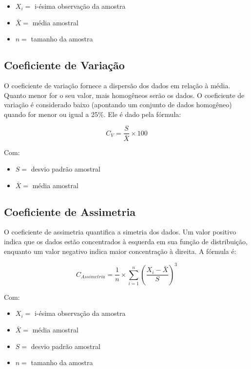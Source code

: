 \documentclass[
]{estat/estat}
\begin{document}
\begin{itemize}
\item
  \(X_i =\) i-ésima observação da amostra
\item
  \(\bar{X} =\) média amostral
\item
  \(n =\) tamanho da amostra
\end{itemize}

\hypertarget{coeficiente-de-variauxe7uxe3o}{%
\subsection{Coeficiente de
Variação}\label{coeficiente-de-variauxe7uxe3o}}

O coeficiente de variação fornece a dispersão dos dados em relação à
média. Quanto menor for o seu valor, mais homogêneos serão os dados. O
coeficiente de variação é considerado baixo (apontando um conjunto de
dados homogêneo) quando for menor ou igual a 25\%. Ele é dado pela
fórmula:

\[C_V=\frac{S}{\bar{X}}\times 100\]

Com:

\begin{itemize}
\item
  \(S =\) desvio padrão amostral
\item
  \(\bar{X} =\) média amostral
\end{itemize}

\hypertarget{coeficiente-de-assimetria}{%
\subsection{Coeficiente de Assimetria}\label{coeficiente-de-assimetria}}

O coeficiente de assimetria quantifica a simetria dos dados. Um valor
positivo indica que os dados estão concentrados à esquerda em sua função
de distribuição, enquanto um valor negativo indica maior concentração à
direita. A fórmula é:

\[C_{Assimetria} = \frac{1}{n}\times\sum\limits_{i=1}^{n} \left(\frac{X_i - \bar{X}}{S}\right)^3 \]

Com:

\begin{itemize}
\item
  \(X_i =\) i-ésima observação da amostra
\item
  \(\bar{X} =\) média amostral
\item
  \(S=\) desvio padrão amostral
\item
  \(n=\) tamanho da amostra
\end{itemize}
\end{document}
